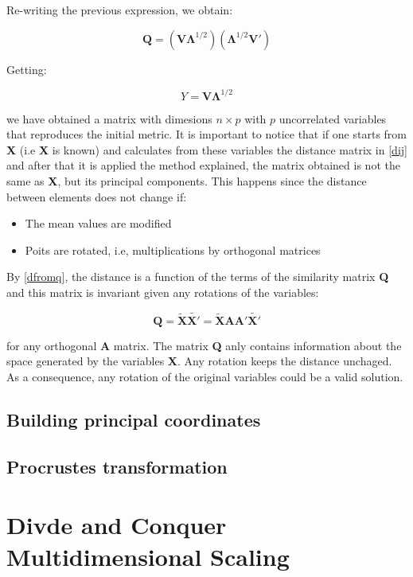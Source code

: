 \documentclass[11pt]{report}
\begin{document}
\indent Re-writing the previous expression, we obtain:

\begin{equation} \label{generalQ}
\mathbf{Q} = (\mathbf{V}\mathbf{\Lambda}^{1/2})(\mathbf{\Lambda}^{1/2}\mathbf{V'})
\end{equation}

Getting:

$$Y = \mathbf{V}\mathbf{\Lambda}^{1/2}$$

we have obtained a matrix with dimesions $n \times p$ with $p$ uncorrelated
variables that reproduces the initial metric. It is important to notice that if 
one starts from \textbf{X} (i.e \textbf{X} is known) and calculates from these
variables the distance matrix in \ref{dij} and after that it is applied
the method explained, the matrix obtained is not the same as \textbf{X}, but
its principal components. This happens since the distance between elements
does not change if:

\begin{itemize}
\item The mean values are modified
\item Poits are rotated, i.e, multiplications by orthogonal matrices
\end{itemize}

\indent By \ref{dfromq}, the distance is a function of the terms of the 
similarity matrix \textbf{Q} and this matrix is invariant given any rotations of
the variables:

$$\mathbf{Q} = \mathbf{\widetilde{X}} \mathbf{\widetilde{X'}} = \mathbf{\widetilde{X}} \mathbf{A} \mathbf{A'}\mathbf{\widetilde{X'}}$$

for any orthogonal \textbf{A} matrix. The matrix \textbf{Q} anly contains 
information about the space generated by the variables \textbf{X}. Any rotation
keeps the distance unchaged. As a consequence, any rotation of the original 
variables could be a valid solution.


\section{Building principal coordinates}

\section{Procrustes transformation}

\chapter{Divde and Conquer Multidimensional Scaling}
\end{document}

